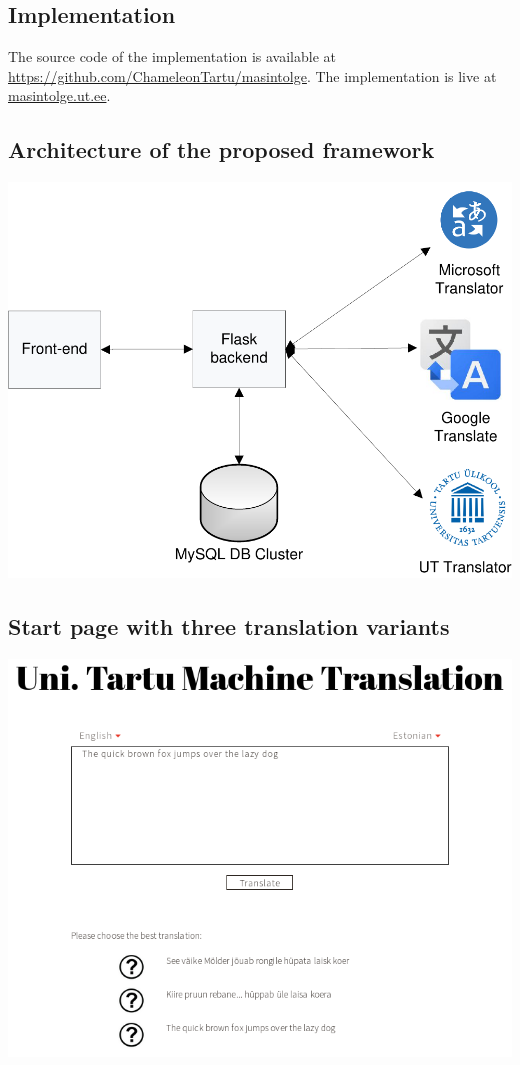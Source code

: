 \documentclass[a0,portrait]{a0poster}
\begin{document}
\begin{multicols}{2}
\section*{Implementation}
The source code of the implementation is available at \url{https://github.com/ChameleonTartu/masintolge}. The implementation is live at \url{masintolge.ut.ee}.

\subsection*{Architecture of the proposed framework}
\begin{center}\vspace{1cm}
\includegraphics[width=0.8\linewidth]{figures/architecture}
\end{center}\vspace{1cm}

\subsection*{Start page with three translation variants}
\begin{center}\vspace{1cm}
	\includegraphics[width=0.9\linewidth]{figures/screenshot1}
\end{center}\vspace{1cm}


\end{multicols}
\end{document}

